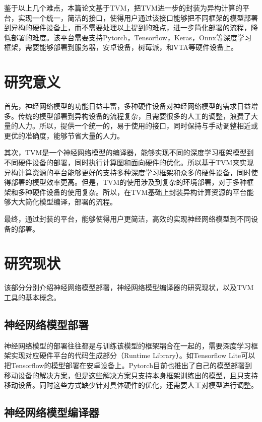 鉴于以上几个难点，本篇论文基于TVM，把TVM进一步的封装为异构计算的平台，实现一个统一，简洁的接口，使得用户通过该接口能够把不同框架的模型部署到异构的硬件设备上，而不需要处理以上提到的难点，进一步简化部署的流程，降低部署的难度。该平台需要支持Pytorch，Tensorflow，Keras，Onnx等深度学习框架，需要能够部署到服务器，安卓设备，树莓派，和VTA等硬件设备上。


\section{研究意义}

首先，神经网络模型的功能日益丰富，多种硬件设备对神经网络模型的需求日益增多。传统的模型部署到异构设备的流程复杂，且需要很多的人工的调整，浪费了大量的人力。所以，提供一个统一的，易于使用的接口，同时保持与手动调整相近或更优的准确度，能够节省大量的人力。

其次，TVM是一个神经网络模型的编译器，能够实现不同的深度学习框架模型到不同硬件设备的部署，同时执行计算图和面向硬件的优化。所以基于TVM来实现异构计算资源的平台能够更好的支持多种深度学习框架和众多的硬件设备，同时使得部署的模型效率更高。但是，TVM的使用涉及到复杂的环境部署，对于多种框架和多种硬件设备的使用复杂。所以，在TVM基础上封装异构计算资源的平台能够大大简化模型编译，部署的流程。

最终，通过封装的平台，能够使得用户更简洁，高效的实现神经网络模型到不同设备的部署。

\section{研究现状}

该部分分别介绍神经网络模型部署，神经网络模型编译器的研究现状，以及TVM工具的基本概念。

\subsection{神经网络模型部署}

神经网络模型的部署往往都是与训练该模型的框架耦合在一起的，需要深度学习框架实现对应硬件平台的代码生成部分（Runtime Library）。如Tensorflow Lite可以把Tensorflow的模型部署在安卓设备上。Pytorch目前也推出了自己的模型部署到移动设备的解决方案，但是这些解决方案只支持本身框架训练出的模型，且只支持移动设备。同时这些方式缺少针对具体硬件的优化，还需要人工对模型进行调整。

\subsection{神经网络模型编译器}

